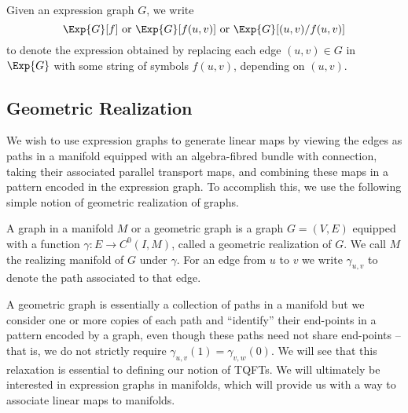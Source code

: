 \documentclass[./Thick_TQFTs_and_Quantum_Information.tex]{subfiles}
\begin{document}
\begin{defn}
Given an expression graph $G$, we write
\[
  \Exp{G}[f] \text{ or } \Exp{G}[f(u, v)] \text{ or } \Exp{G}[(u, v)/f(u, v)]
\]
to denote the expression obtained by replacing each edge $(u, v) \in G$ in
$\Exp{G}$ with some string of symbols $f(u, v)$, depending on $(u, v)$.
\end{defn}

\subsection{Geometric Realization}

We wish to use expression graphs to generate linear maps by viewing the edges as
paths in a manifold equipped with an algebra-fibred bundle with connection,
taking their associated parallel transport maps, and combining these maps in a
pattern encoded in the expression graph. To accomplish this, we use the
following simple notion of geometric realization of graphs.

\begin{defn}
A graph in a manifold $M$ or a geometric graph is a graph $G = (V, E)$ equipped
with a function $\gamma : E \to C^0(I, M)$, called a geometric realization of
$G$. We call $M$ the realizing manifold of $G$ under $\gamma$. For an edge from
$u$ to $v$ we write $\gamma_{u, v}$ to denote the path associated to that edge.
\end{defn}

\begin{rmk}
A geometric graph is essentially a collection of paths in a manifold but we
consider one or more copies of each path and ``identify'' their end-points in a
pattern encoded by a graph, even though these paths need not share end-points --
that is, we do not strictly require $\gamma_{u, v}(1) = \gamma_{v, w}(0)$. We
will see that this relaxation is essential to defining our notion of TQFTs. We
will ultimately be interested in expression graphs in manifolds, which will
provide us with a way to associate linear maps to manifolds.
\end{rmk}
\end{document}
